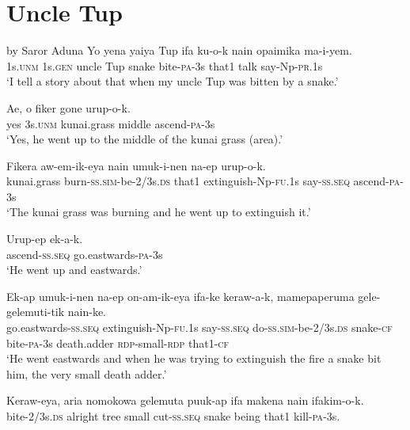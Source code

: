 \section{Uncle Tup} 
 by Saror Aduna
\ea
\gll  Yo  yena  yaiya  Tup  ifa  ku-o-k  nain  opaimika     ma-i-yem. \\
1s.\textsc{unm}  1s.\textsc{gen}  uncle  Tup  snake  bite-\textsc{pa}-3s  that1  talk  say-Np-\textsc{pr}.1s \\
\glt ‘I tell a story about that when my uncle Tup was bitten by a snake.’ \\
\z


\ea
\gll  Ae,  o  fiker  gone  urup-o-k. \\
yes  3s.\textsc{unm}  kunai.grass  middle  ascend-\textsc{pa}-3s \\
\glt ‘Yes, he went up to the middle of the kunai grass (area).’ \\
\z


\ea
\gll  Fikera  aw-em-ik-eya  nain  umuk-i-nen                       na-ep  urup-o-k. \\
kunai.grass  burn-\textsc{ss}.\textsc{sim}-be-2/3s.\textsc{ds}  that1  extinguish-Np-\textsc{fu}.1s    say-\textsc{ss.seq}  ascend-\textsc{pa}-3s \\
\glt ‘The kunai grass was burning and he went up to extinguish it.’ \\
\z


\ea
\gll  Urup-ep  ek-a-k. \\
ascend-\textsc{ss.seq}  go.eastwards-\textsc{pa}-3s \\
\glt ‘He went up and eastwards.’ \\
\z


\ea
\gll  Ek-ap  umuk-i-nen  na-ep                        on-am-ik-eya  ifa-ke  keraw-a-k,  mamepaperuma             gele-gelemuti-tik  nain-ke. \\
go.eastwards-\textsc{ss.seq}  extinguish-Np-\textsc{fu}.1s  say-\textsc{ss.seq}  do-\textsc{ss}.\textsc{sim}-be-2/3s.\textsc{ds}  snake-\textsc{cf}  bite-\textsc{pa}-3s  death.adder    \textsc{rdp}-small-\textsc{rdp}  that1-\textsc{cf} \\




\glt ‘He went eastwards and when he was trying to extinguish the fire a snake bit him, the very small death adder.’ \\
\z


\ea
\gll  Keraw-eya,  aria  nomokowa  gelemuta  puuk-ap  ifa  makena  nain  ifakim-o-k. \\
bite-2/3s.\textsc{ds}  alright  tree  small  cut-\textsc{ss.seq}  snake  being      that1  kill-\textsc{pa}-3s. \\


